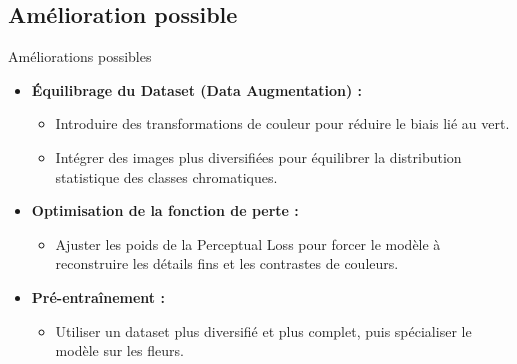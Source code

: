 \documentclass{beamer}
\begin{document}
\subsection{Amélioration possible}
\begin{frame}{Améliorations possibles}
    \begin{itemize}
        \item \textbf{Équilibrage du Dataset (Data Augmentation) :}
        \begin{itemize}
            \item Introduire des transformations de couleur pour réduire le biais lié au vert.
            \item Intégrer des images plus diversifiées pour équilibrer la distribution statistique des classes chromatiques.
        \end{itemize}

        \item \textbf{Optimisation de la fonction de perte :}
        \begin{itemize}
            \item Ajuster les poids de la Perceptual Loss pour forcer le modèle à reconstruire les détails fins et les contrastes de couleurs.
        \end{itemize}
        \item \textbf{Pré-entraînement :}
        \begin{itemize}
            \item Utiliser un dataset plus diversifié et plus complet, puis spécialiser le modèle sur les fleurs.
        \end{itemize}
    \end{itemize}
\end{frame}
\end{document}
